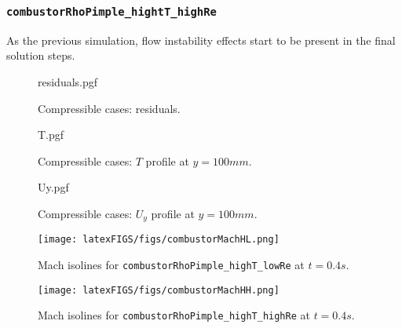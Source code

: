 \cprotect\subsubsection{\verb|combustorRhoPimple_hightT_highRe|}
As the previous simulation, flow instability effects start to be present in the final solution steps. 

\newpage

\setcounter{lastPage}{\thepage}
\setcounter{page}{1}
\renewcommand{\thepage}{COM-\roman{page}}

\begin{figure}[!h]
    \centering
    {residuals.pgf}
    \caption{Compressible cases: residuals.}
    \label{fig:residualComp}
\end{figure}

\begin{figure}[!h]
    \centering
    {T.pgf}
    \caption{Compressible cases: $T$ profile at $y = 100mm$.}
    \label{fig:Tcomp}
\end{figure}

\begin{figure}[!h]
    \centering
    {Uy.pgf}
    \caption{Compressible cases: $U_y$ profile at $y = 100mm$.}
    \label{fig:UyCOMP}
\end{figure}

\begin{figure}[!h]
    \texttt{[image: latexFIGS/figs/combustorMachHL.png]}
    \cprotect\caption{Mach isolines for \verb|combustorRhoPimple_highT_lowRe| at $t = 0.4s$.}
\end{figure}

\begin{figure}[!h]
    \texttt{[image: latexFIGS/figs/combustorMachHH.png]}
    \cprotect\caption{Mach isolines for \verb|combustorRhoPimple_highT_highRe| at $t = 0.4s$.}
\end{figure}

\clearpage
